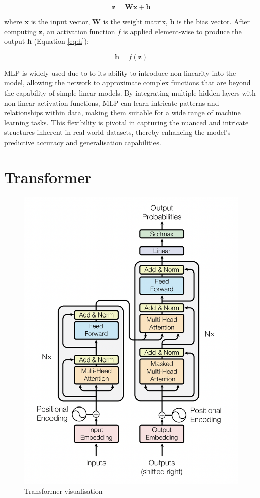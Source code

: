 \begin{equation}
    \label{eq:z}
    \mathbf{z} = \mathbf{W}\mathbf{x} + \mathbf{b}
\end{equation}

where \( \mathbf{x} \) is the input vector, \( \mathbf{W} \) is the weight matrix, \( \mathbf{b} \) is the bias vector. After computing \( \mathbf{z} \), an activation function \( f \) is applied element-wise to produce the output \( \mathbf{h} \) (Equation \eqref{eq:h}):

\begin{equation}
    \label{eq:h}
    \mathbf{h} = f(\mathbf{z})
\end{equation}

MLP is widely used due to to its ability to introduce non-linearity into the model, allowing the network to approximate complex functions that are beyond the capability of simple linear models. By integrating multiple hidden layers with non-linear activation functions, MLP can learn intricate patterns and relationships within data, making them suitable for a wide range of machine learning tasks. This flexibility is pivotal in capturing the nuanced and intricate structures inherent in real-world datasets, thereby enhancing the model's predictive accuracy and generalisation capabilities.


\section{Transformer}

\begin{figure}[htbp]
    \centering
    \includegraphics[width=0.7\linewidth]{images/transformer.png}
    \caption{Transformer visualisation \cite{vaswani-2023-attention}}
    \label{fig:transformer}
\end{figure}

